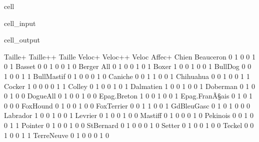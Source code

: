 \documentclass[letterpaper,10pt,french]{sphinxmanual}
\begin{document}
\begin{sphinxuseclass}{cell}
\begin{sphinxuseclass}{cell_input}
\end{sphinxuseclass}
\begin{sphinxuseclass}{cell_output}
\begin{sphinxVerbatim}[commandchars=\\\{\}]
                 Taille+  Taille++  Taille\PYGZhy{}  Veloc+  Veloc++  Veloc\PYGZhy{}  Affec+  \PYGZbs{}
Chien                                                                          
Beauceron              0         1        0       0        1       0       1   
Basset                 0         0        1       0        0       1       0   
Berger All             0         1        0       0        1       0       1   
Boxer                  1         0        0       1        0       0       1   
Bull\PYGZhy{}Dog               0         0        1       0        0       1       1   
Bull\PYGZhy{}Mastif            0         1        0       0        0       1       0   
Caniche                0         0        1       1        0       0       1   
Chihuahua              0         0        1       0        0       1       1   
Cocker                 1         0        0       0        0       1       1   
Colley                 0         1        0       0        1       0       1   
Dalmatien              1         0        0       1        0       0       1   
Doberman               0         1        0       0        1       0       0   
Dogue\PYGZhy{}All              0         1        0       0        1       0       0   
Epag.\PYGZhy{}Breton           1         0        0       1        0       0       1   
Epag.\PYGZhy{}FranÃ\S{}ais        0         1        0       1        0       0       0   
Fox\PYGZhy{}Hound              0         1        0       0        1       0       0   
Fox\PYGZhy{}Terrier            0         0        1       1        0       0       1   
Gd\PYGZhy{}Bleu\PYGZhy{}Gasc           0         1        0       1        0       0       0   
Labrador               1         0        0       1        0       0       1   
Levrier                0         1        0       0        1       0       0   
Mastiff                0         1        0       0        0       1       0   
Pekinois               0         0        1       0        0       1       1   
Pointer                0         1        0       0        1       0       0   
St\PYGZhy{}Bernard             0         1        0       0        0       1       0   
Setter                 0         1        0       0        1       0       0   
Teckel                 0         0        1       0        0       1       1   
Terre\PYGZhy{}Neuve            0         1        0       0        0       1       0   


\end{sphinxVerbatim}
\end{sphinxuseclass}
\end{sphinxuseclass}
\end{document}
